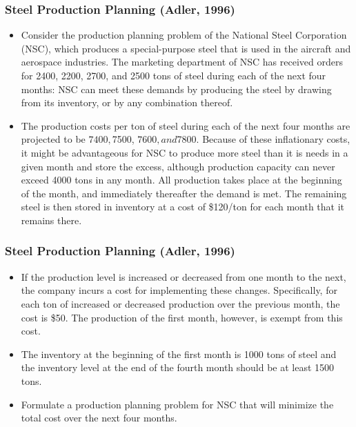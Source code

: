 \documentclass[11pt]{beamer}
\begin{document}
\begin{frame}
\frametitle{Steel Production Planning (Adler, 1996)}
\begin{itemize}
\item Consider the production planning problem of the National Steel Corporation (NSC), which produces a special-purpose steel that is used in the aircraft and aerospace industries. The marketing department of NSC has received orders for 2400, 2200, 2700, and 2500 tons of steel during each of the next four months: NSC can meet these demands by producing the steel by drawing from its inventory, or by any combination thereof.
\item The production costs per ton of steel during each of the next four months are projected to be $7400, $7500, $7600, and $7800. Because of these inflationary costs, it might be advantageous for NSC to produce more steel than it is needs in a given month and store the excess, although production capacity can never exceed 4000 tons in any month. All production takes place at the beginning of the month, and immediately thereafter the demand is met. The remaining steel is then stored in inventory at a cost of \$120/ton for each month that it remains there.
\end{itemize}

\end{frame}


\begin{frame}
\frametitle{Steel Production Planning (Adler, 1996)}
\begin{itemize}
\item If the production level is increased or decreased from one month to the next, the company incurs a cost for implementing these changes. Specifically, for each ton of increased or decreased production over the previous month, the cost is \$50. The production of the first month, however, is exempt from this cost.
\item The inventory at the beginning of the first month is 1000 tons of steel and the inventory level at the end of the fourth month should be at least 1500 tons.
\item Formulate a production planning problem for NSC that will minimize the total cost over the next four months.
\end{itemize}

\end{frame}
\end{document}
